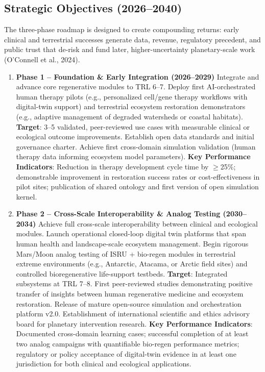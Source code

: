 \documentclass[11pt,a4paper]{article}
\begin{document}
\subsection{Strategic Objectives (2026--2040)}

The three-phase roadmap is designed to create compounding returns: early clinical and terrestrial successes generate data, revenue, regulatory precedent, and public trust that de-risk and fund later, higher-uncertainty planetary-scale work (O'Connell et al., 2024).

\begin{enumerate}[leftmargin=*,itemsep=0.25em]
    \item \textbf{Phase 1 -- Foundation \& Early Integration (2026--2029)}  
    Integrate and advance core regenerative modules to TRL 6--7. Deploy first AI-orchestrated human therapy pilots (e.g., personalized cell/gene therapy workflows with digital-twin support) and terrestrial ecosystem restoration demonstrators (e.g., adaptive management of degraded watersheds or coastal habitats).  
    \textbf{Target}: 3--5 validated, peer-reviewed use cases with measurable clinical or ecological outcome improvements. Establish open data standards and initial governance charter. Achieve first cross-domain simulation validation (human therapy data informing ecosystem model parameters).  
    \textbf{Key Performance Indicators}: Reduction in therapy development cycle time by $\geq$25\%; demonstrable improvement in restoration success rates or cost-effectiveness in pilot sites; publication of shared ontology and first version of open simulation kernel.

    \item \textbf{Phase 2 -- Cross-Scale Interoperability \& Analog Testing (2030--2034)}  
    Achieve full cross-scale interoperability between clinical and ecological modules. Launch operational closed-loop digital twin platforms that span human health and landscape-scale ecosystem management. Begin rigorous Mars/Moon analog testing of ISRU + bio-regen modules in terrestrial extreme environments (e.g., Antarctic, Atacama, or Arctic field sites) and controlled bioregenerative life-support testbeds.  
    \textbf{Target}: Integrated subsystems at TRL 7--8. First peer-reviewed studies demonstrating positive transfer of insights between human regenerative medicine and ecosystem restoration. Release of mature open-source simulation and orchestration platform v2.0. Establishment of international scientific and ethics advisory board for planetary intervention research.  
    \textbf{Key Performance Indicators}: Documented cross-domain learning cases; successful completion of at least two analog campaigns with quantifiable bio-regen performance metrics; regulatory or policy acceptance of digital-twin evidence in at least one jurisdiction for both clinical and ecological applications.


\end{enumerate}
\end{document}
